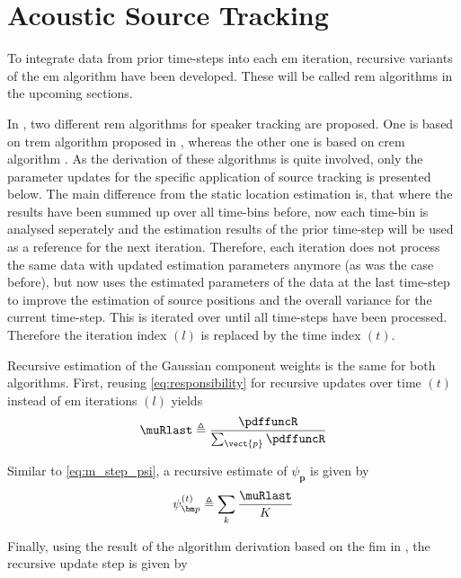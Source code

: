 \section{Acoustic Source Tracking}
\label{sec:algSrcTrack}

To integrate data from prior time-steps into each \gls{em} iteration, recursive variants of the \gls{em} algorithm have been developed. These will be called \gls{rem} algorithms in the upcoming sections.

In \cite{Schwartz2014}, two different \gls{rem} algorithms for speaker tracking are proposed. One is based on \gls{trem} algorithm proposed in \cite{Titterington1984}, whereas the other one is based on \gls{crem} algorithm \cite{Cappe2009}.
As the derivation of these algorithms is quite involved, only the parameter updates for the specific application of source tracking is presented below.
The main difference from the static location estimation is, that where the results have been summed up over all time-bins before, now each time-bin is analysed seperately and the estimation results of the prior time-step will be used as a reference for the next iteration. Therefore, each iteration does not process the same data with updated estimation parameters anymore (as was the case before), but now uses the estimated parameters of the data at the last time-step to improve the estimation of source positions and the overall variance for the current time-step. This is iterated over until all time-steps have been processed. Therefore the iteration index $(l)$ is replaced by the time index $(t)$.


Recursive estimation of the Gaussian component weights is the same for both algorithms. First, reusing \eqref{eq:responsibility} for recursive updates over time $(t)$ instead of \gls{em} iterations $(l)$ yields
\begin{equation}
    \muRlast \triangleq \frac{\pdffuncR}{\sum_{\vect{p}}\pdffuncR}
\end{equation}

Similar to \eqref{eq:m_step_psi}, a recursive estimate of $\psi_{\bm p}$ is given by
\begin{equation}
    \psi_{\bm p}^{(t)}\triangleq\sum_k \frac{\muRlast}{K}
\end{equation}

Finally, using the result of the algorithm derivation based on the \gls{fim} in \cite{Schwartz2014}, the recursive update step is given by


